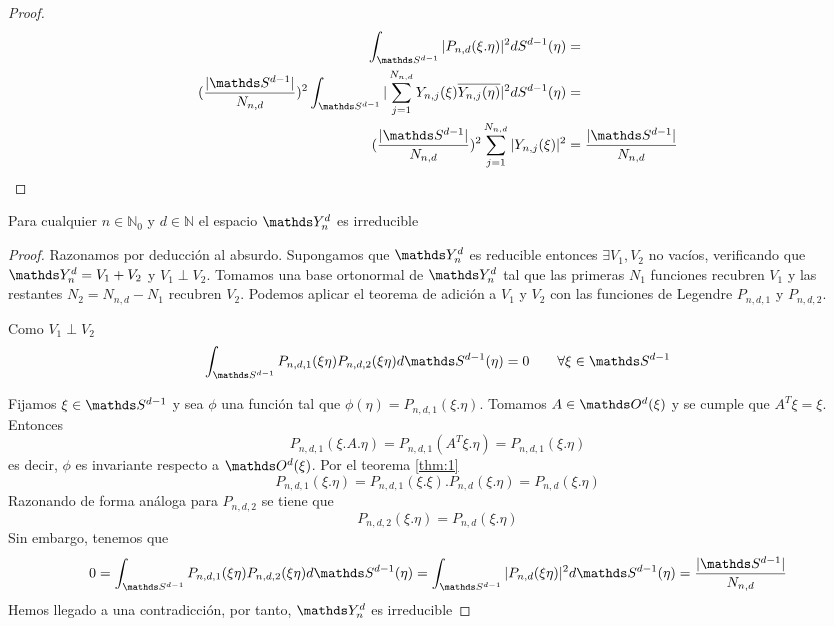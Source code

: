 \begin{proof}

	\begin{gather*}
		\begin{aligned}
	\sphint |P_{n,d}(\xi.\eta)|^2 dS^{d-1}(\eta) &= \\ (\frac{|\sphere|}{N_{n,d}})^2 \sphint |\sum_{j=1}^{N_{n,d}} Y_{n,j}(\xi)\overline{Y_{n,j}(\eta)}|^2 dS^{d-1}(\eta)  &=\\  (\frac{|\sphere|}{N_{n,d}})^2 \sum_{j=1}^{N_{n,d}} |Y_{n,j}(\xi)|^2 &= \frac{|\sphere|}{N_{n,d}}
	\end{aligned}
	\end{gather*}	
	
	
	
\end{proof}
\begin{thm}Para cualquier $n\in\mathds{N}_0$ y $d\in\mathds{N}$ el espacio $\spharm$ es irreducible
\end{thm}
\begin{proof}
Razonamos por deducción al absurdo. Supongamos que $\spharm$ es reducible entonces $\exists V_1,V_2$ no vacíos, verificando que $\spharm = V_1 + V_2$ y $V_1 \perp V_2$. Tomamos una base ortonormal de $\spharm$ tal que las primeras $N_1$ funciones recubren $V_1$ y las restantes $N_2 = N_{n,d} - N_1$ recubren  $V_2$. Podemos aplicar el teorema de adición a $V_1$ y $V_2$ con las funciones de Legendre $P_{n,d,1}$ y $P_{n,d,2}$.
\medskip

Como $V_1 \perp V_2$ 
\begin{equation}\label{eq:1}
\int_{\sphere} P_{n,d,1}(\xi\eta)P_{n,d,2}(\xi\eta)d\sphere(\eta) = 0 \qquad \forall\xi\in\sphere
\end{equation}

Fijamos $\xi\in\sphere$ y sea $\phi$ una función tal que $\phi(\eta) = P_{n,d,1}(\xi.\eta)$. Tomamos $A\in\orto(\xi)$ y se cumple que $A^T\xi= \xi$. Entonces
$$P_{n,d,1}(\xi.A.\eta) = P_{n,d,1}(A^T\xi.\eta)=P_{n,d,1}(\xi.\eta)
$$
es decir, $\phi$ es invariante respecto a $\orto(\xi)$. Por el teorema \hyperref[]{\ref{thm:1}}
$$
P_{n,d,1}(\xi.\eta) = P_{n,d,1}(\xi.\xi).P_{n,d}(\xi.\eta) = P_{n,d}(\xi.\eta)
$$
Razonando de forma análoga para $P_{n,d,2}$ se tiene que
$$
P_{n,d,2}(\xi.\eta) = P_{n,d}(\xi.\eta)
$$
Sin embargo, tenemos que 
$$ 0=\int_{\sphere}P_{n,d,1}(\xi\eta)P_{n,d,2}(\xi\eta)d\sphere(\eta) =\int_{\sphere} |P_{n,d}(\xi\eta)|^2 d\sphere(\eta) = \frac{|\sphere|}{N_{n,d}}
$$
Hemos llegado a una contradicción, por tanto, $\spharm$ es irreducible
\end{proof}
